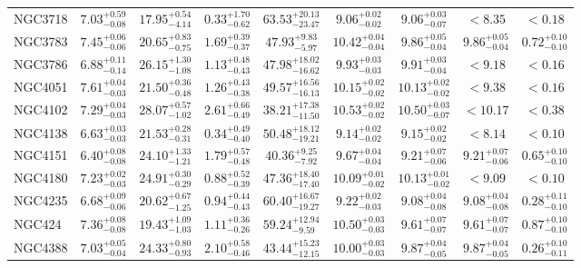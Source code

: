 \documentclass[onecolumn]{mn2e}
\begin{document}
{\begin{center}
\begin{longtable}{lcccccccc}
NGC3718 & $7.03_{-0.08}^{+0.59}$ & $17.95_{-4.14}^{+0.54}$ & $0.33_{-0.62}^{+1.70}$ &$63.53_{-23.47}^{+20.13}$ & $9.06_{-0.02}^{+0.02}$ & $9.06_{-0.07}^{+0.03}$ & $<8.35$ & $<0.18$ \\
NGC3783 & $7.45_{-0.06}^{+0.06}$ & $20.65_{-0.75}^{+0.83}$ & $1.69_{-0.37}^{+0.39}$ &$47.93_{-5.97}^{+9.83}$ & $10.42_{-0.04}^{+0.04}$ & $9.86_{-0.04}^{+0.05}$ & $9.86_{-0.04}^{+0.05}$ & $0.72_{-0.10}^{+0.10}$ \\
NGC3786 & $6.88_{-0.14}^{+0.11}$ & $26.15_{-1.08}^{+1.30}$ & $1.13_{-0.43}^{+0.48}$ &$47.98_{-16.62}^{+18.02}$ & $9.93_{-0.03}^{+0.03}$ & $9.91_{-0.04}^{+0.03}$ & $<9.18$ & $<0.16$ \\
NGC4051 & $7.61_{-0.03}^{+0.04}$ & $21.50_{-0.48}^{+0.36}$ & $1.26_{-0.38}^{+0.43}$ &$49.57_{-16.13}^{+16.56}$ & $10.15_{-0.02}^{+0.02}$ & $10.13_{-0.02}^{+0.02}$ & $<9.38$ & $<0.16$ \\
NGC4102 & $7.29_{-0.03}^{+0.04}$ & $28.07_{-1.02}^{+0.57}$ & $2.61_{-0.49}^{+0.66}$ &$38.21_{-11.50}^{+17.38}$ & $10.53_{-0.02}^{+0.02}$ & $10.50_{-0.07}^{+0.03}$ & $<10.17$ & $<0.38$ \\
NGC4138 & $6.63_{-0.03}^{+0.03}$ & $21.53_{-0.31}^{+0.28}$ & $0.34_{-0.40}^{+0.49}$ &$50.48_{-19.21}^{+18.12}$ & $9.14_{-0.02}^{+0.02}$ & $9.15_{-0.02}^{+0.02}$ & $<8.14$ & $<0.10$ \\
NGC4151 & $6.40_{-0.08}^{+0.08}$ & $24.10_{-1.21}^{+1.33}$ & $1.79_{-0.48}^{+0.57}$ &$40.36_{-7.92}^{+9.25}$ & $9.67_{-0.04}^{+0.04}$ & $9.21_{-0.06}^{+0.07}$ & $9.21_{-0.06}^{+0.07}$ & $0.65_{-0.10}^{+0.10}$ \\
NGC4180 & $7.23_{-0.03}^{+0.02}$ & $24.91_{-0.29}^{+0.30}$ & $0.88_{-0.39}^{+0.52}$ &$47.36_{-17.40}^{+18.40}$ & $10.09_{-0.02}^{+0.01}$ & $10.13_{-0.02}^{+0.01}$ & $<9.09$ & $<0.10$ \\
NGC4235 & $6.68_{-0.06}^{+0.09}$ & $20.62_{-1.25}^{+0.67}$ & $0.94_{-0.43}^{+0.44}$ &$60.40_{-19.27}^{+16.67}$ & $9.22_{-0.03}^{+0.02}$ & $9.08_{-0.08}^{+0.04}$ & $9.08_{-0.08}^{+0.04}$ & $0.28_{-0.10}^{+0.11}$ \\
NGC424 & $7.36_{-0.08}^{+0.08}$ & $19.43_{-1.03}^{+1.09}$ & $1.11_{-0.26}^{+0.36}$ &$59.24_{-9.59}^{+12.94}$ & $10.50_{-0.03}^{+0.03}$ & $9.61_{-0.07}^{+0.07}$ & $9.61_{-0.07}^{+0.07}$ & $0.87_{-0.10}^{+0.10}$ \\
NGC4388 & $7.03_{-0.04}^{+0.05}$ & $24.33_{-0.93}^{+0.80}$ & $2.10_{-0.46}^{+0.58}$ &$43.44_{-12.15}^{+15.23}$ & $10.00_{-0.03}^{+0.03}$ & $9.87_{-0.05}^{+0.04}$ & $9.87_{-0.05}^{+0.04}$ & $0.26_{-0.11}^{+0.10}$ \\

\end{longtable}
\end{center}}
\end{document}
